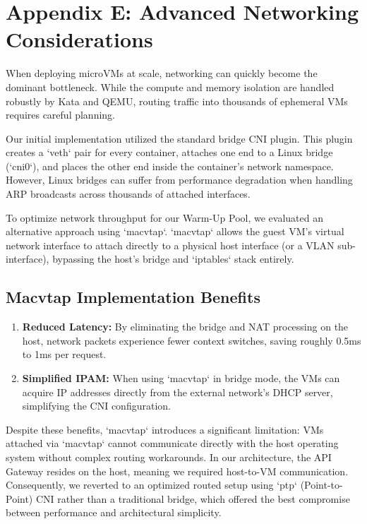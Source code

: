 \documentclass[12pt,a4paper]{report}
\begin{document}
\section{Appendix E: Advanced Networking Considerations}

When deploying microVMs at scale, networking can quickly become the dominant bottleneck. While the compute and memory isolation are handled robustly by Kata and QEMU, routing traffic into thousands of ephemeral VMs requires careful planning.

Our initial implementation utilized the standard bridge CNI plugin. This plugin creates a `veth` pair for every container, attaches one end to a Linux bridge (`cni0`), and places the other end inside the container's network namespace. However, Linux bridges can suffer from performance degradation when handling ARP broadcasts across thousands of attached interfaces.

To optimize network throughput for our Warm-Up Pool, we evaluated an alternative approach using `macvtap`. `macvtap` allows the guest VM's virtual network interface to attach directly to a physical host interface (or a VLAN sub-interface), bypassing the host's bridge and `iptables` stack entirely.

\subsection{Macvtap Implementation Benefits}
\begin{enumerate}
    \item \textbf{Reduced Latency:} By eliminating the bridge and NAT processing on the host, network packets experience fewer context switches, saving roughly 0.5ms to 1ms per request.
    \item \textbf{Simplified IPAM:} When using `macvtap` in bridge mode, the VMs can acquire IP addresses directly from the external network's DHCP server, simplifying the CNI configuration.
\end{enumerate}

Despite these benefits, `macvtap` introduces a significant limitation: VMs attached via `macvtap` cannot communicate directly with the host operating system without complex routing workarounds. In our architecture, the API Gateway resides on the host, meaning we required host-to-VM communication. Consequently, we reverted to an optimized routed setup using `ptp` (Point-to-Point) CNI rather than a traditional bridge, which offered the best compromise between performance and architectural simplicity.
\end{document}
